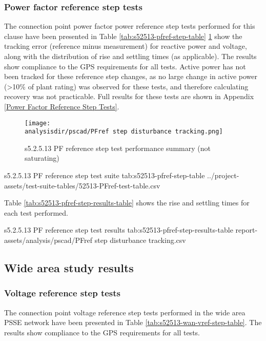\documentclass{../grid-link-report}
\newcommand{\projectassetsdir}{../project-assets}
\newcommand{\analysisdir}{report-assets/analysis}
\begin{document}
	\subsubsection{Power factor reference step tests}
	
	The connection point power factor power reference step tests performed for this clause have been presented in Table \ref{tab:s52513-pfref-step-table} \ref{fig:s52513-pfref-step-unsaturated-summary-plot} show the tracking error (reference minus measurement) for reactive power and voltage, along with the distribution of rise and settling times (as applicable). The results show compliance to the GPS requirements for all tests. Active power has not been tracked for these reference step changes, as no large change in active power (>10\% of plant rating) was observed for these tests, and therefore calculating recovery was not practicable. Full results for these tests are shown in Appendix \ref{Power Factor Reference Step Tests}.
	
	
	\begin{figure}[H]
		\centering
		\texttt{[image: \\analysisdir/pscad/PFref step disturbance tracking.png]}
		\caption{s5.2.5.13 PF reference step test performance summary (not saturating)}
		\label{fig:s52513-pfref-step-unsaturated-summary-plot}
	\end{figure}
	
	{
		\fontsize{9}{10}\selectfont
		\autoscaledlongtable
		{s5.2.5.13 PF reference step test suite}
		{tab:s52513-pfref-step-table}
		{\projectassetsdir/test-suite-tables/52513-PFref-test-table.csv}
	}
	
	Table \ref{tab:s52513-pfref-step-results-table} shows the rise and settling times for each test performed.
	
	{
		\fontsize{9}{13}\selectfont
		\autoscaledlongtable
		{s5.2.5.13 PF reference step test results}
		{tab:s52513-pfref-step-results-table}
		{report-assets/analysis/pscad/PFref step disturbance tracking.csv}
	}
	
	\subsection{Wide area study results}
	
	\subsubsection{Voltage reference step tests}
	
	The connection point voltage reference step tests performed in the wide area PSSE network have been presented in Table \ref{tab:s52513-wan-vref-step-table}. The results show compliance to the GPS requirements for all tests.
	
\end{document}
